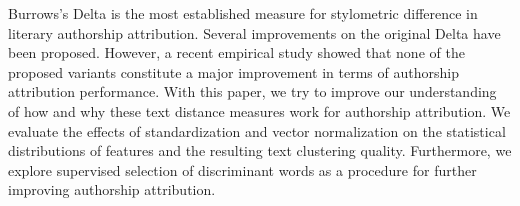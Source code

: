 Burrows's Delta is the most established measure for stylometric difference in literary authorship attribution. Several improvements on the original Delta have been proposed. However, a recent empirical study showed that none of the proposed variants constitute a major improvement in terms of authorship attribution performance. With this paper, we try to improve our understanding of how and why these text distance measures work for authorship attribution. We evaluate the effects of standardization and vector normalization on the statistical distributions of features and the resulting text clustering quality. Furthermore, we explore supervised selection of discriminant words as a procedure for further improving authorship attribution.
